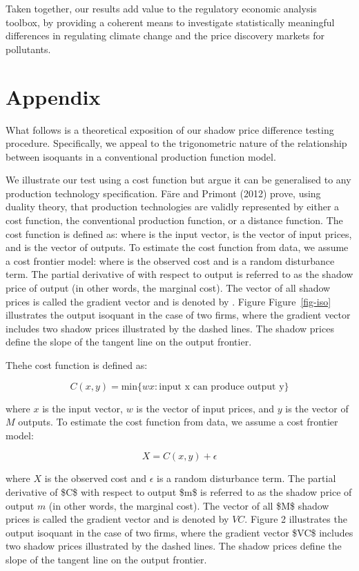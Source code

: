 \documentclass[
  letterpaper,
  DIV=11,
  numbers=noendperiod]{scrartcl}
\begin{document}
Taken together, our results add value to the regulatory economic
analysis toolbox, by providing a coherent means to investigate
statistically meaningful differences in regulating climate change and
the price discovery markets for pollutants.

\hypertarget{appendix}{%
\section{Appendix}\label{appendix}}

What follows is a theoretical exposition of our shadow price difference
testing procedure. Specifically, we appeal to the trigonometric nature
of the relationship between isoquants in a conventional production
function model.

We illustrate our test using a cost function but argue it can be
generalised to any production technology specification. Färe and Primont
(2012) prove, using duality theory, that production technologies are
validly represented by either a cost function, the conventional
production function, or a distance function. The cost function is
defined as: where is the input vector, is the vector of input prices,
and is the vector of outputs. To estimate the cost function from data,
we assume a cost frontier model: where is the observed cost and is a
random disturbance term. The partial derivative of with respect to
output is referred to as the shadow price of output (in other words, the
marginal cost). The vector of all shadow prices is called the gradient
vector and is denoted by . Figure Figure~\ref{fig-iso} illustrates the
output isoquant in the case of two firms, where the gradient vector
includes two shadow prices illustrated by the dashed lines. The shadow
prices define the slope of the tangent line on the output frontier.

Thehe cost function is defined as:

\[
C(x,y)=\text{min} \{wx:\text{input x can produce output y}\}
\]

where \(x\) is the input vector, \(w\) is the vector of input prices,
and \(y\) is the vector of \(M\) outputs. To estimate the cost function
from data, we assume a cost frontier model:

\[X=C(x,y) + \epsilon\]

where \(X\) is the observed cost and \(\epsilon\) is a random
disturbance term. The partial derivative of \$C\$ with respect to output
\$m\$ is referred to as the shadow price of output \(m\) (in other
words, the marginal cost). The vector of all \$M\$ shadow prices is
called the gradient vector and is denoted by \(VC\). Figure 2
illustrates the output isoquant in the case of two firms, where the
gradient vector \$VC\$ includes two shadow prices illustrated by the
dashed lines. The shadow prices define the slope of the tangent line on
the output frontier.
\end{document}
